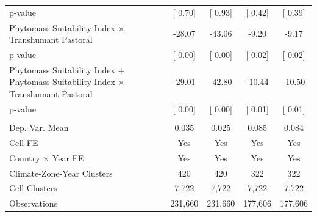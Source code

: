 {\begin{tabular}{l*{4}{c}}
\hspace{15pt} p-value&[     0.70]         &[     0.93]         &[     0.42]         &[     0.39]         \\
[1em] \hspace{15pt} Phytomass Suitability Index $\times$ Transhumant Pastoral&-28.07         &-43.06         & -9.20         & -9.17         \\
\hspace{15pt} p-value&[     0.00]         &[     0.00]         &[     0.02]         &[     0.02]         \\
[1em]  \hspace{15pt} Phytomass Suitability Index $+$ Phytomass Suitability Index $\times$ Transhumant Pastoral&-29.01         &-42.80         &-10.44         &-10.50         \\
\hspace{15pt} p-value&[     0.00]         &[     0.00]         &[     0.01]         &[     0.01]         \\
\hline \\ Dep. Var. Mean& 0.035         & 0.025         & 0.085         & 0.084         \\
Cell FE             &   Yes         &   Yes         &   Yes         &   Yes         \\
Country $\times$ Year FE&   Yes         &   Yes         &   Yes         &   Yes         \\
Climate-Zone-Year Clusters&   420         &   420         &   322         &   322         \\
Cell Clusters       & 7,722         & 7,722         & 7,722         & 7,722         \\
Observations        &231,660         &231,660         &177,606         &177,606         \\
\bottomrule
\end{tabular}
}
